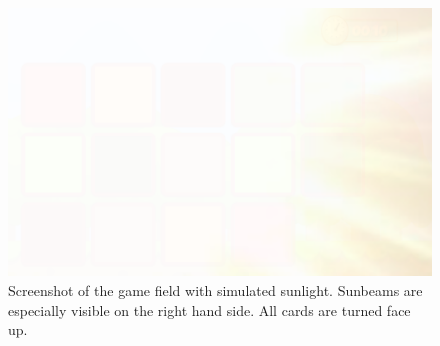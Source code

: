 \begin{figure}[H]
	\centering
	\includegraphics[width=13.5cm]{images/glareEffect.png}
	\caption[Screenshot of the game field with simulated sunlight.]{Screenshot of the game field with simulated sunlight. Sunbeams are especially visible on the right hand side. All cards are turned face up.}
	\label{fig:glareEffect}
\end{figure}